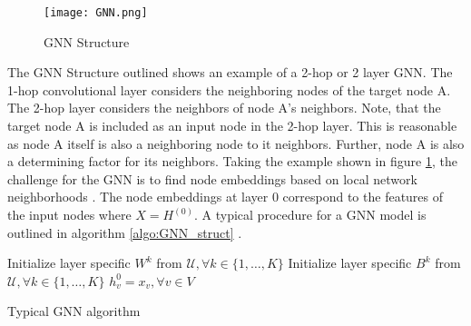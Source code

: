 	\begin{figure}
		\centering
		\texttt{[image: GNN.png]}
		\caption{GNN Structure}
		\cite{leskovec2021lecture}
		\label{fig:GNN_structure}
	\end{figure}


	\noindent The GNN Structure outlined shows an example of a 2-hop or 2 layer GNN. 
	The 1-hop convolutional layer considers the neighboring nodes of the target node A. 
	The 2-hop layer considers the neighbors of node A's neighbors. Note, that the 
	target node A is included as an input node in the 2-hop layer. This is reasonable 
	as node A itself is also a neighboring node to it neighbors. Further, node 
	A is also a determining factor for its neighbors. Taking the example shown in
	figure \ref{fig:GNN_structure}, the challenge for the GNN is to find node
	embeddings based on local network neighborhoods
	\citep{leskovec2021lecture}. The node embeddings at layer 0 correspond to
	the features of the input nodes where $X = H^{(0)}$. A typical procedure
	for a GNN model is outlined in algorithm \ref{algo:GNN_struct}
	\citep{hamilton2017inductive,leskovec2021lecture,you2020design}.
	

	\begin{algorithm}
		\scriptsize
		\SetAlgoLined
		\nl Initialize layer specific $W^{k}$ from $\mathcal{U},\forall k \in 
			\{1,\dots,K\}$\;
		\nl Initialize layer specific $B^{k}$ from $\mathcal{U},\forall k \in
			\{1,\dots,K\}$\;
		\nl $h_{v}^{0} = x_{v},\forall v \in V$\\
		\nl {}
		\caption{Typical GNN algorithm}
		\label{algo:GNN_struct}
	\end{algorithm}


